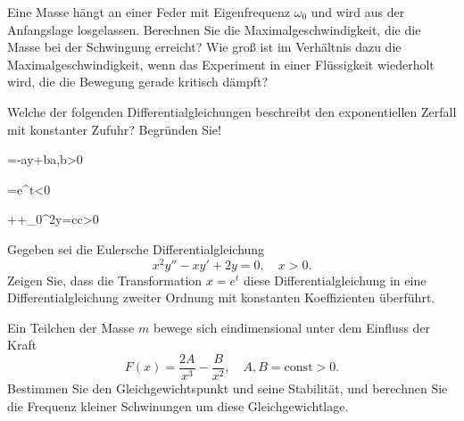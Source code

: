 \begin{atiTask}[
	title = Weitere Fragen,
	language = Deutsch
]
	\begin{atiSubtasks}
	\item 
	Eine Masse hängt an einer Feder mit Eigenfrequenz $\omega_0$ und wird aus der Anfangslage losgelassen. Berechnen Sie die Maximalgeschwindigkeit, die die Masse bei der Schwingung erreicht? Wie groß ist im Verhältnis dazu die Maximalgeschwindigkeit, wenn das Experiment in einer Flüssigkeit wiederholt wird, die die Bewegung gerade kritisch dämpft?
	
	\item Welche der folgenden Differentialgleichungen beschreibt den exponentiellen Zerfall mit konstanter Zufuhr? Begründen Sie!
	\begin{atiSubequations}
	\item {=-ay+b\quad a,b>0}
	\item {=e^{\alpha t}\quad \alpha<0}
	\item {+\gamma {}+\omega_0^2y=c\quad c>0}
	\end{atiSubequations} 
	\item Gegeben sei die Eulersche Differentialgleichung
	\begin{equation*}
	x^2y''-xy'+2y=0,\quad x>0.
	\end{equation*}
	Zeigen Sie, dass die Transformation $x=e^t$ diese Differentialgleichung in eine Differentialgleichung zweiter Ordnung mit konstanten Koeffizienten überführt.
	\item Ein Teilchen der Masse $m$ bewege sich eindimensional unter dem Einfluss der Kraft
	\begin{equation*}
	F(x)=\frac{2A}{x^3}-\frac{B}{x^2},\quad A,B=\text{const}>0.
	\end{equation*}
	Bestimmen Sie den Gleichgewichtspunkt und seine Stabilität, und berechnen Sie die Frequenz kleiner Schwinungen um diese Gleichgewichtlage.
	\end{atiSubtasks}
\end{atiTask}
